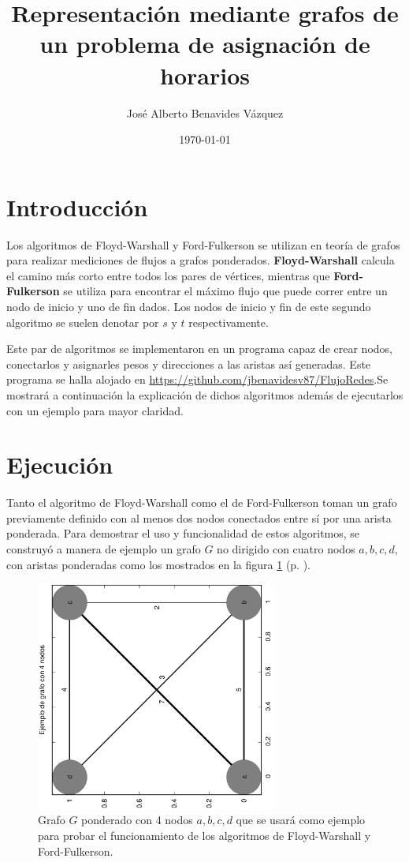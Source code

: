 \documentclass{article}
\title{Representación mediante grafos de un problema de asignación de horarios}
\author{José Alberto Benavides Vázquez}
\date{\today}
\begin{document}
  \maketitle

  \section{Introducción}

  Los algoritmos de Floyd-Warshall y Ford-Fulkerson se utilizan en teoría de grafos para realizar mediciones de flujos a grafos ponderados. \textbf{Floyd-Warshall} calcula el camino más corto entre todos los pares de vértices, mientras que \textbf{Ford-Fulkerson} se utiliza para encontrar el máximo flujo que puede correr entre un nodo de inicio y uno de fin dados. Los nodos de inicio y fin de este segundo algoritmo se suelen denotar por $s$ y $t$ respectivamente.

  Este par de algoritmos se implementaron en un programa capaz de crear nodos, conectarlos y asignarles pesos y direcciones a las aristas así generadas. Este programa se halla alojado en \url{https://github.com/jbenavidesv87/FlujoRedes}.Se mostrará a continuación la explicación de dichos algoritmos además de ejecutarlos con un ejemplo para mayor claridad.

  \section{Ejecución}
  Tanto el algoritmo de Floyd-Warshall como el de Ford-Fulkerson toman un grafo previamente definido con al menos dos nodos conectados entre sí por una arista ponderada. Para demostrar el uso y funcionalidad de estos algoritmos, se construyó a manera de ejemplo un grafo $G$ no dirigido con cuatro nodos $a, b, c, d$, con aristas ponderadas como los mostrados en la figura \ref{fig:ejemplo} (p. \pageref{fig:ejemplo}).

  \begin{figure}[h]
    \includegraphics[width=0.7\textwidth, angle=-90]{ejemplo} %
    \centering
    \caption{Grafo $G$ ponderado con 4 nodos $a, b, c, d$ que se usará como ejemplo para probar el funcionamiento de los algoritmos de Floyd-Warshall y Ford-Fulkerson.}
    \label{fig:ejemplo}
  \end{figure}
\end{document}
